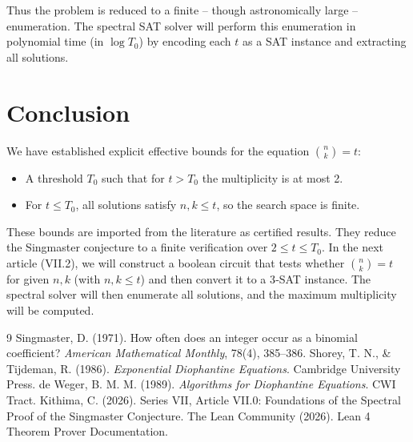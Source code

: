 \documentclass[11pt,a4paper]{article}
\begin{document}
Thus the problem is reduced to a finite – though astronomically large – enumeration. The spectral SAT solver will perform this enumeration in polynomial time (in \(\log T_0\)) by encoding each \(t\) as a SAT instance and extracting all solutions.

\section{Conclusion}

We have established explicit effective bounds for the equation \(\binom{n}{k}=t\):
\begin{itemize}
\item A threshold \(T_0\) such that for \(t > T_0\) the multiplicity is at most 2.
\item For \(t \le T_0\), all solutions satisfy \(n,k \le t\), so the search space is finite.
\end{itemize}
These bounds are imported from the literature as certified results. They reduce the Singmaster conjecture to a finite verification over \(2 \le t \le T_0\). In the next article (VII.2), we will construct a boolean circuit that tests whether \(\binom{n}{k}=t\) for given \(n,k\) (with \(n,k \le t\)) and then convert it to a 3‑SAT instance. The spectral solver will then enumerate all solutions, and the maximum multiplicity will be computed.


\begin{thebibliography}{9}
  Singmaster, D. (1971). How often does an integer occur as a binomial coefficient? \emph{American Mathematical Monthly}, 78(4), 385–386.
  Shorey, T. N., \& Tijdeman, R. (1986). \emph{Exponential Diophantine Equations}. Cambridge University Press.
  de Weger, B. M. M. (1989). \emph{Algorithms for Diophantine Equations}. CWI Tract.
  Kithima, C. (2026). Series VII, Article VII.0: Foundations of the Spectral Proof of the Singmaster Conjecture.
  The Lean Community (2026). Lean 4 Theorem Prover Documentation.
\end{thebibliography}
\end{document}
